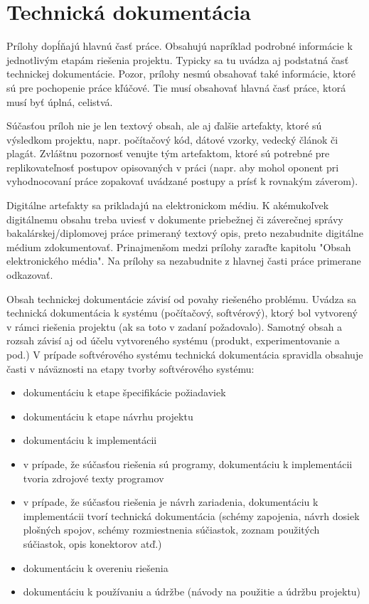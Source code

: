 \documentclass[12pt, a4paper, twoside, openright, slovak]{book}
\begin{document}
\setcounter{figure}{0}
\chapter{Technická dokumentácia}
\renewcommand*{\thepage}{A-\arabic{page}}

Prílohy dopĺňajú hlavnú časť práce. Obsahujú napríklad podrobné informácie k jednotlivým
etapám riešenia projektu. Typicky sa tu uvádza aj podstatná časť technickej dokumentácie.
Pozor, prílohy nesmú obsahovať také informácie, ktoré sú pre pochopenie práce kľúčové. Tie
musí obsahovať hlavná časť práce, ktorá musí byť úplná, celistvá.

Súčasťou príloh nie je len textový obsah, ale aj ďalšie artefakty, ktoré sú výsledkom projektu,
napr. počítačový kód, dátové vzorky, vedecký článok či plagát. Zvláštnu pozornosť venujte tým
artefaktom, ktoré sú potrebné pre replikovateľnosť postupov opisovaných v práci (napr. aby
mohol oponent pri vyhodnocovaní práce zopakovať uvádzané postupy a prísť k rovnakým
záverom). 

Digitálne artefakty sa prikladajú na elektronickom médiu. K akémukoľvek
digitálnemu obsahu treba uviesť v dokumente priebežnej či záverečnej správy
bakalárskej/diplomovej práce primeraný textový opis, preto nezabudnite digitálne médium
zdokumentovať. Prinajmenšom medzi prílohy zaraďte kapitolu "Obsah elektronického média".
Na prílohy sa nezabudnite z hlavnej časti práce primerane odkazovať.

Obsah technickej dokumentácie závisí od povahy riešeného problému. Uvádza sa technická dokumentácia k systému (počítačový, softvérový), ktorý bol vytvorený v rámci riešenia projektu (ak sa toto v zadaní požadovalo). Samotný obsah a rozsah závisí aj od účelu vytvoreného systému (produkt, experimentovanie a pod.)
V prípade softvérového systému technická dokumentácia spravidla obsahuje časti v náväznosti na etapy tvorby softvérového systému:
\begin{itemize}
	\item dokumentáciu k etape špecifikácie požiadaviek
    \item dokumentáciu k etape návrhu projektu
    \item dokumentáciu k implementácii
    \item v prípade, že súčasťou riešenia sú programy, dokumentáciu k implementácii tvoria zdrojové texty programov
    \item v prípade, že súčasťou riešenia je návrh zariadenia, dokumentáciu k implementácii tvorí technická dokumentácia (schémy zapojenia, návrh dosiek plošných spojov, schémy rozmiestnenia súčiastok, zoznam použitých súčiastok, opis konektorov atď.)
    \item dokumentáciu k overeniu riešenia
    \item dokumentáciu k používaniu a údržbe (návody na použitie a údržbu projektu)
\end{itemize}
\end{document}
